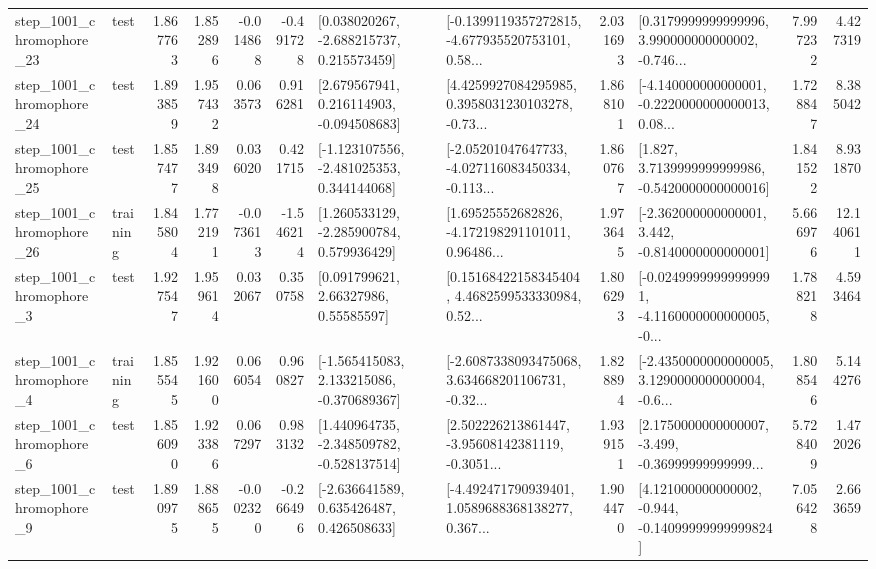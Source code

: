 \begin{tabular}{llrrrrllrlrr}
 step\_1001\_chromophore\_23 &      test &      1.867763 &    1.852896 &     -0.014868 & -0.491728 &    [0.038020267, -2.688215737, 0.215573459] &  [-0.1399119357272815, -4.677935520753101, 0.58... &       2.031693 &  [0.3179999999999996, 3.990000000000002, -0.746... &            7.997232 &          4.427319 \\
 step\_1001\_chromophore\_24 &      test &      1.893859 &    1.957432 &      0.063573 &  0.916281 &    [2.679567941, 0.216114903, -0.094508683] &  [4.4259927084295985, 0.3958031230103278, -0.73... &       1.868101 &  [-4.140000000000001, -0.2220000000000013, 0.08... &            1.728847 &          8.385042 \\
 step\_1001\_chromophore\_25 &      test &      1.857477 &    1.893498 &      0.036020 &  0.421715 &   [-1.123107556, -2.481025353, 0.344144068] &  [-2.05201047647733, -4.027116083450334, -0.113... &       1.860767 &   [1.827, 3.7139999999999986, -0.5420000000000016] &            1.841522 &          8.931870 \\
 step\_1001\_chromophore\_26 &  training &      1.845804 &    1.772191 &     -0.073613 & -1.546214 &    [1.260533129, -2.285900784, 0.579936429] &  [1.69525552682826, -4.172198291101011, 0.96486... &       1.973645 &   [-2.362000000000001, 3.442, -0.8140000000000001] &            5.666976 &         12.140611 \\
  step\_1001\_chromophore\_3 &      test &      1.927547 &    1.959614 &      0.032067 &  0.350758 &       [0.091799621, 2.66327986, 0.55585597] &  [0.15168422158345404, 4.4682599533330984, 0.52... &       1.806293 &  [-0.02499999999999991, -4.1160000000000005, -0... &            1.788218 &          4.593464 \\
  step\_1001\_chromophore\_4 &  training &      1.855545 &    1.921600 &      0.066054 &  0.960827 &   [-1.565415083, 2.133215086, -0.370689367] &  [-2.6087338093475068, 3.634668201106731, -0.32... &       1.828894 &  [-2.4350000000000005, 3.1290000000000004, -0.6... &            1.808546 &          5.144276 \\
  step\_1001\_chromophore\_6 &      test &      1.856090 &    1.923386 &      0.067297 &  0.983132 &   [1.440964735, -2.348509782, -0.528137514] &  [2.502226213861447, -3.95608142381119, -0.3051... &       1.939151 &  [2.1750000000000007, -3.499, -0.36999999999999... &            5.728409 &          1.472026 \\
  step\_1001\_chromophore\_9 &      test &      1.890975 &    1.888655 &     -0.002320 & -0.266496 &    [-2.636641589, 0.635426487, 0.426508633] &  [-4.492471790939401, 1.0589688368138277, 0.367... &       1.904470 &  [4.121000000000002, -0.944, -0.14099999999999824] &            7.056428 &          2.663659 \\

\end{tabular}
